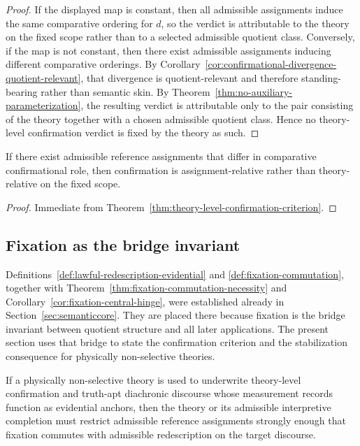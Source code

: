 \begin{proof}
If the displayed map is constant, then all admissible assignments induce the same comparative
ordering for $d$, so the verdict is attributable to the theory on the fixed scope rather than to a
selected admissible quotient class. Conversely, if the map is not constant, then there exist admissible
assignments inducing different comparative orderings. By Corollary~\ref{cor:confirmational-divergence-quotient-relevant},
that divergence is quotient-relevant and therefore standing-bearing rather than semantic skin. By
Theorem~\ref{thm:no-auxiliary-parameterization}, the resulting verdict is attributable only to the pair
consisting of the theory together with a chosen admissible quotient class. Hence no theory-level
confirmation verdict is fixed by the theory as such.
\end{proof}

\begin{corollary}
\label{thm:confirmational-consequence}
\label{cor:confirmation-collapse}
If there exist admissible reference assignments that differ in comparative confirmational role, then
confirmation is assignment-relative rather than theory-relative on the fixed scope.
\end{corollary}

\begin{proof}
Immediate from Theorem~\ref{thm:theory-level-confirmation-criterion}.
\end{proof}

\subsection{Fixation as the bridge invariant}

Definitions~\ref{def:lawful-redescription-evidential} and \ref{def:fixation-commutation}, together with
Theorem~\ref{thm:fixation-commutation-necessity} and
Corollary~\ref{cor:fixation-central-hinge}, were established already in
Section~\ref{sec:semanticcore}. They are placed there because fixation is the bridge invariant between
quotient structure and all later applications. The present section uses that bridge to state the
confirmation criterion and the stabilization consequence for physically non-selective theories.

\begin{theorem}
\label{thm:reference-stabilization-necessity}
\label{cor:stabilization-requirement}
If a physically non-selective theory is used to underwrite theory-level confirmation and truth-apt
diachronic discourse whose measurement records function as evidential anchors, then the theory or
its admissible interpretive completion must restrict admissible reference assignments strongly enough
that fixation commutes with admissible redescription on the target discourse.
\end{theorem}

